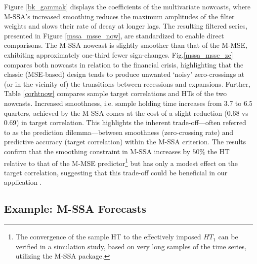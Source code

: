 \documentclass[11pt,a4paper]{article}
\begin{document}
Figure \eqref{bk_gammak} displays the coefficients of the multivariate nowcasts, where M-SSA's increased smoothing reduces the maximum amplitudes of the filter weights and slows their rate of decay at longer lags. The resulting filtered series, presented in Figure \eqref{mssa_msse_now}, are standardized to enable direct comparisons. The M-SSA nowcast is slightly smoother than that of the M-MSE, exhibiting approximately one-third fewer sign-changes. Fig.\eqref{mssa_msse_zc} compares both nowcasts in relation to the financial crisis, highlighting that the classic (MSE-based) design tends to produce unwanted `noisy' zero-crossings at (or in the vicinity of) the transitions between recessions and expansions. Further, Table \eqref{corhtnow} compares sample target correlations and HTs of the two nowcasts. Increased smoothness, i.e. sample holding time increases from 3.7 to 6.5 quarters, achieved by the M-SSA comes at the cost of a slight reduction (0.68 vs 0.69) in target correlation. This highlights the inherent trade-off—often referred to as the prediction dilemma—between smoothness (zero-crossing rate) and predictive accuracy (target correlation) within the M-SSA criterion. 
The results confirm that the smoothing constraint in M-SSA
increases by $50\%$ the HT relative to that of the M-MSE predictor\footnote{The convergence of the sample HT to the effectively imposed $HT_1$  can be verified in a simulation study, based on  very long samples of the time series, utilizing the M-SSA package.} but has only a modest effect on the target correlation, suggesting that this trade-off could be beneficial in our application
. %


\subsection{Example: M-SSA Forecasts}
\end{document}
